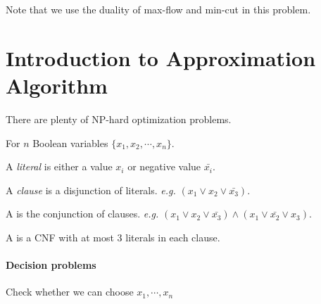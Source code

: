     \begin{remark}
        Note that we use the duality of max-flow and min-cut in this problem.
    \end{remark}

    \section{Introduction to Approximation Algorithm}
    There are plenty of NP-hard optimization problems.

    \begin{example}[3-CNF]
        For  $ n  $ Boolean variables  $ \{x_1,x_2,\cdots,x_n\} $.

        A \textit{literal} is either a value  $ x_i $ or negative value  $ \bar{x_i} $.

        A \textit{clause} is a disjunction of literals. \textit{e.g.}  $ (x_1\vee x_2\vee \bar{x_3}) $.

        A  is the conjunction of clauses. \textit{e.g.}  $ (x_1\vee x_2\vee \bar{x_3})\wedge (x_1\vee \bar{x_2}\vee x_3) $.

        A  is a CNF with at most  $ 3 $ literals in each clause.
    \end{example}

    \paragraph{Decision problems}
    Check whether we can choose  $ x_1,\cdots,x_n $
\paragraph{}


